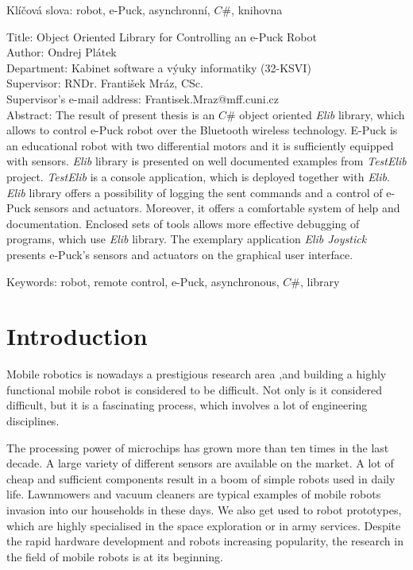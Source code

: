 \documentclass[12pt,notitlepage]{report}
\begin{document}
\noindent Klíčová slova: robot, e-Puck, asynchronní, $C\#$, knihovna

\vspace{10mm}

\noindent
Title: Object Oriented Library for Controlling an e-Puck Robot\\
Author: Ondrej Plátek\\
Department: Kabinet software a výuky informatiky (32-KSVI)\\
Supervisor: RNDr. František Mráz, CSc.\\
Supervisor's e-mail address: Frantisek.Mraz@mff.cuni.cz\\

\noindent Abstract: The result of present thesis is an $C\#$ object oriented {\it Elib} library, which allows to control 
e-Puck robot over the Bluetooth wireless technology. E-Puck is an educational robot with two differential motors and 
it is sufficiently equipped with sensors.
{\it Elib} library is presented on well documented examples from {\it TestElib} project. {\it TestElib} is a console application,
which is deployed together with {\it Elib}.
{\it Elib} library offers a possibility of logging the sent commands and a control of e-Puck sensors and actuators.
Moreover, it offers a comfortable system of help and documentation.
Enclosed sets of tools allows more effective debugging of programs, which use {\it Elib} library.
The exemplary application {\it Elib Joystick} presents e-Puck's sensors and actuators on the graphical user interface.

\noindent Keywords: robot, remote control, e-Puck, asynchronous, $C\#$, library

\newpage

\chapter{Introduction}
\label{chap:intro}
	Mobile robotics is nowadays a prestigious research area ,and building a highly functional 
	mobile robot is considered to be difficult. 
	Not only is it considered difficult, but it is a fascinating process, which
	involves a lot of engineering disciplines.
	
	The processing power of microchips has grown more than ten times in the last decade. 
	A large variety of different sensors are available on the market.	
	A lot of cheap and sufficient components result in a boom of simple robots used in daily life. 
	Lawnmowers and vacuum cleaners are typical examples of mobile robots invasion into our households in these days.
	We also get used to robot prototypes, which are highly specialised in the space exploration or in army services.
	Despite the rapid hardware development and robots increasing popularity,
	the research in the field of mobile robots is at its beginning. 
	
\end{document}
